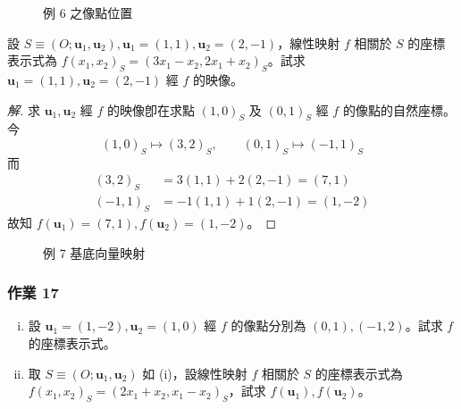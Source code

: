 \begin{figure}[H]
\centering
{}
\caption{例 6 之像點位置}
\label{fig:b4-1-3-7}
\end{figure}

\begin{example}[例 7]
設 $S \equiv (O; \mathbf{u}_1, \mathbf{u}_2), \mathbf{u}_1 = (1, 1), \mathbf{u}_2 = (2, -1)$，線性映射 $f$ 相關於 $S$ 的座標表示式為 $f(x_1, x_2)_S = (3x_1 - x_2, 2x_1 + x_2)_S$。試求 $\mathbf{u}_1 = (1, 1), \mathbf{u}_2 = (2, -1)$ 經 $f$ 的映像。
\end{example}

\begin{proof}[解]
求 $\mathbf{u}_1, \mathbf{u}_2$ 經 $f$ 的映像卽在求點 $(1, 0)_S$ 及 $(0, 1)_S$ 經 $f$ 的像點的自然座標。今
\[ (1, 0)_S \mapsto (3, 2)_S, \qquad (0, 1)_S \mapsto (-1, 1)_S \]
而
\begin{align*}
(3, 2)_S &= 3(1, 1) + 2(2, -1) = (7, 1) \\
(-1, 1)_S &= -1(1, 1) + 1(2, -1) = (1, -2)
\end{align*}
故知 $f(\mathbf{u}_1) = (7, 1), f(\mathbf{u}_2) = (1, -2)$。
\end{proof}

\begin{figure}[H]
\centering
{}
\caption{例 7 基底向量映射}
\label{fig:b4-1-3-8}
\end{figure}

\subsubsection*{作業 17}
\begin{enumerate}[(i)]
  \item 設 $\mathbf{u}_1 = (1, -2), \mathbf{u}_2 = (1, 0)$ 經 $f$ 的像點分別為 $(0, 1), (-1, 2)$。試求 $f$ 的座標表示式。
  \item 取 $S \equiv (O; \mathbf{u}_1, \mathbf{u}_2)$ 如 (i)，設線性映射 $f$ 相關於 $S$ 的座標表示式為 $f(x_1, x_2)_S = (2x_1 + x_2, x_1 - x_2)_S$，試求 $f(\mathbf{u}_1), f(\mathbf{u}_2)$。
\end{enumerate}

